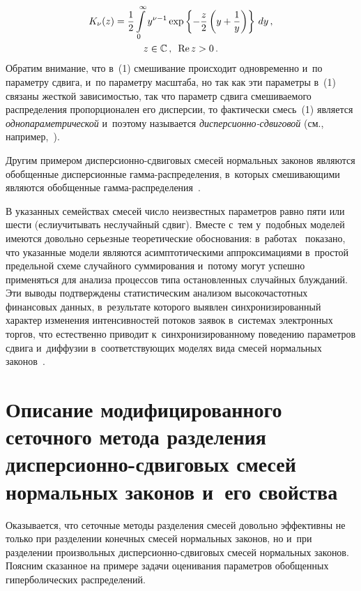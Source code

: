 \begin{multicols}{2}
\noindent
\begin{multline*}
K_{\nu}(z)=\displaystyle\frac{\displaystyle 1\mathstrut}{\displaystyle 2\mathstrut}\int\limits_{0}^{\infty}y^{\nu-1}\exp
\left\{-\displaystyle\frac{\displaystyle z\mathstrut}{\displaystyle 2\mathstrut}\left(y+\displaystyle\frac{\displaystyle 1\mathstrut}{\displaystyle y\mathstrut}\right)\right\}\,dy\,,\\
z\in\mathbb{C}\,,\enskip \mathrm{Re}\,z>0\,.
\end{multline*}
Обратим внимание, что в~(1) смешивание происходит одновременно и~по
параметру сдвига, и~по параметру масштаба, но так как эти параметры
в~(1)  связаны жесткой зависимостью, так что параметр сдвига
смешиваемого распределения пропорционален его дисперсии, то
фактически смесь~(1) является {\it однопараметрической} и~поэтому
называется {\it дис\-пер\-си\-он\-но-сдви\-го\-вой} (см., например,~\cite{BN1982}).

Другим примером дис\-пер\-си\-он\-но-сдви\-го\-вых смесей нормальных законов
являются обобщенные дисперсионные гам\-ма-рас\-пре\-де\-ле\-ния, в~которых
смешивающими являются обобщенные гам\-ма-рас\-пре\-де\-ле\-ния~\cite{ks2012, zk2013}.

В указанных семействах смесей число неизвестных параметров равно
пяти или шести (если\linebreak учитывать неслучайный сдвиг). Вместе
с~тем у~подоб\-ных моделей имеются довольно серьезные тео\-ре\-ти\-че\-ские
обоснования: в~работах~\cite{zk2013, k2013} показано, что указанные
модели являются асимптотическими аппроксимациями в~простой
предельной схеме случайного суммирования и~потому могут успешно
применяться для анализа процессов типа остановленных случайных
блужданий. Эти выводы подтверждены статистическим анализом
вы\-со\-ко\-час\-тот\-ных финансовых данных, в~результате которого выявлен
синхронизированный характер изменения интенсивностей потоков заявок
в~сис\-те\-мах электронных торгов, что естественно приводит к~синхронизированному
поведению па\-ра\-мет\-ров сдвига и~диффузии в~соответствующих моделях вида смесей
нормальных законов~\cite{kckg2013}.

\section{Описание моди\-фи\-ци\-ро\-ван\-но\-го
сеточного ме\-то\-да разделения дисперсионно-сдвиговых смесей
нормальных законов и~его свойства}

Оказывается, что сеточные методы разделения смесей довольно
эффективны не только при разделении конечных смесей нормальных
законов, но и~при разделении произвольных дис\-пер\-си\-он\-но-сдви\-го\-вых
смесей нормальных законов. Поясним сказанное на примере задачи
оценивания па\-ра\-мет\-ров обобщенных гиперболических распределений.


\end{multicols}
